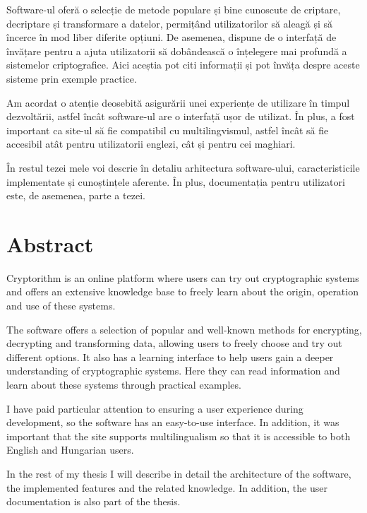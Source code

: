 Software-ul oferă o selecție de metode populare și bine cunoscute de criptare, decriptare și transformare a datelor, permițând utilizatorilor să aleagă și să încerce în mod liber diferite opțiuni. De asemenea, dispune de o interfață de învățare pentru a ajuta utilizatorii să dobândească o înțelegere mai profundă a sistemelor criptografice. Aici aceștia pot citi informații și pot învăța despre aceste sisteme prin exemple practice. 

Am acordat o atenție deosebită asigurării unei experiențe de utilizare în timpul dezvoltării, astfel încât software-ul are o interfață ușor de utilizat. În plus, a fost important ca site-ul să fie compatibil cu multilingvismul, astfel încât să fie accesibil atât pentru utilizatorii englezi, cât și pentru cei maghiari.

În restul tezei mele voi descrie în detaliu arhitectura software-ului, caracteristicile implementate și cunoștințele aferente. În plus, documentația pentru utilizatori este, de asemenea, parte a tezei.

\vfill
{}

\chapter*{Abstract}

Cryptorithm is an online platform where users can try out cryptographic systems and offers an extensive knowledge base to freely learn about the origin, operation and use of these systems.

The software offers a selection of popular and well-known methods for encrypting, decrypting and transforming data, allowing users to freely choose and try out different options. It also has a learning interface to help users gain a deeper understanding of cryptographic systems. Here they can read information and learn about these systems through practical examples. 

I have paid particular attention to ensuring a user experience during development, so the software has an easy-to-use interface. In addition, it was important that the site supports multilingualism so that it is accessible to both English and Hungarian users.

In the rest of my thesis I will describe in detail the architecture of the software, the implemented features and the related knowledge. In addition, the user documentation is also part of the thesis.

\vfill
\dolgozatnyelve
{}